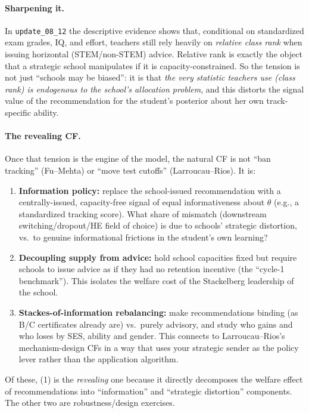 \documentclass{article}
\begin{document}
\paragraph{Sharpening it.}  In \texttt{update\_08\_12} the descriptive evidence
shows that, conditional on standardized exam grades, IQ, and effort, teachers
still rely heavily on \emph{relative class rank} when issuing horizontal
(STEM/non-STEM) advice. Relative rank is exactly the object that a strategic
school manipulates if it is capacity-constrained. So the tension is not just
``schools may be biased'': it is that \emph{the very statistic teachers use
(class rank) is endogenous to the school's allocation problem}, and this
distorts the signal value of the recommendation for the student's posterior
about her own track-specific ability.

\paragraph{The revealing CF.}  Once that tension is the engine of the model,
the natural CF is not ``ban tracking'' (Fu--Mehta) or ``move test cutoffs''
(Larroucau--Rios). It is:
\begin{enumerate}[leftmargin=*]
  \item \textbf{Information policy:} replace the school-issued recommendation
  with a centrally-issued, capacity-free signal of equal informativeness about
  $\theta$ (e.g., a standardized tracking score). What share of mismatch
  (downstream switching/dropout/HE field of choice) is due to schools'
  strategic distortion, vs.\ to genuine informational frictions in the
  student's own learning?

  \item \textbf{Decoupling supply from advice:} hold school capacities fixed
  but require schools to issue advice as if they had no retention incentive
  (the ``cycle-1 benchmark'').  This isolates the welfare cost of the
  Stackelberg leadership of the school.

  \item \textbf{Stackes-of-information rebalancing:} make recommendations
  binding (as B/C certificates already are) vs.\ purely advisory, and study
  who gains and who loses by SES, ability and gender. This connects to
  Larroucau--Rios's mechanism-design CFs in a way that uses your strategic
  sender as the policy lever rather than the application algorithm.
\end{enumerate}
Of these, (1) is the \emph{revealing} one because it directly decomposes the
welfare effect of recommendations into ``information'' and ``strategic
distortion'' components. The other two are robustness/design exercises.
\end{document}

